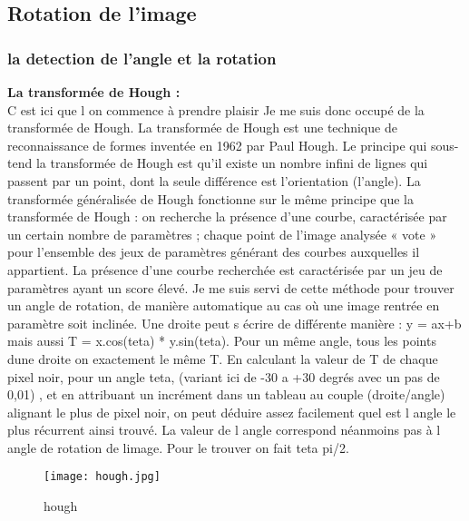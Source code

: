 \documentclass{article}
\begin{document}
              \subsection{Rotation de l'image }
                          \subsubsection {la detection de l'angle et la rotation}
\textbf{La transformée de Hough :}\\
C est ici que l on commence à prendre plaisir Je me suis donc occupé de la transformée de Hough. La transformée de Hough est une technique de reconnaissance de formes inventée en 1962 par Paul Hough. Le principe qui sous-tend la transformée de Hough est qu’il existe un nombre infini de lignes qui passent par un point, dont la seule différence est l’orientation (l’angle). La transformée généralisée de Hough fonctionne sur le même principe que la transformée de Hough : on recherche la présence d’une courbe, caractérisée par un certain nombre de paramètres ; chaque point de l’image analysée « vote » pour l’ensemble des jeux de paramètres générant des courbes auxquelles il appartient. La présence d’une courbe recherchée est caractérisée par un jeu de paramètres ayant un score élevé. Je me suis servi de cette méthode pour trouver un angle de rotation, de manière automatique au cas où une image rentrée en paramètre soit inclinée. Une droite peut s écrire de différente manière : y = ax+b mais aussi T = x.cos(teta) * y.sin(teta). Pour un même angle, tous les points dune droite on exactement le même T. En calculant la valeur de T de chaque pixel noir, pour un angle teta, (variant ici de -30 a +30 degrés avec un pas de 0,01) , et en attribuant un incrément dans un tableau au couple (droite/angle) alignant le plus de pixel noir, on peut déduire assez facilement quel est l angle le plus récurrent ainsi trouvé. La valeur de l angle correspond néanmoins pas à l angle de rotation de limage. Pour le trouver on fait teta pi/2.
\\
    \begin{figure}[hp]
	    \centering
	    \texttt{[image: hough.jpg]}
	    \caption{hough}
    \end{figure}
\\
\end{document}
